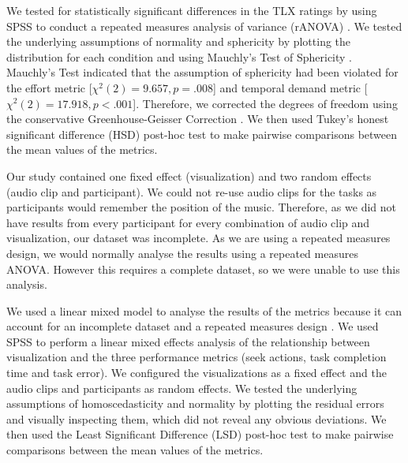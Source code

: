 We tested for statistically significant differences in the TLX ratings by using SPSS to conduct a repeated measures
analysis of variance (rANOVA) \citep[p.~409]{Shalabh2009}.  We tested the underlying assumptions of normality and
sphericity by plotting the distribution for each condition and using Mauchly's Test of Sphericity
\citep[p.~415]{Shalabh2009}.  Mauchly's Test indicated that the assumption of sphericity had been violated for the
effort metric [$\chi^2(2) = 9.657, p=.008$] and temporal demand metric [$\chi^2(2) = 17.918, p<.001$]. Therefore, we
corrected the degrees of freedom using the conservative Greenhouse-Geisser Correction \citep[p.~416]{Shalabh2009}.  We
then used Tukey's honest significant difference (HSD) post-hoc test \citep[p.~139]{Shalabh2009} to make pairwise
comparisons between the mean values of the metrics.

Our study contained one fixed effect (visualization) and two random effects (audio clip and participant).  We could not
re-use audio clips for the tasks as participants would remember the position of the music.  Therefore, as we did not
have results from every participant for every combination of audio clip and visualization, our dataset was incomplete.
As we are using a repeated measures design, we would normally analyse the results using a repeated measures ANOVA.
However this requires a complete dataset, so we were unable to use this analysis.

We used a linear mixed model to analyse the results of the metrics because it can account for an incomplete dataset and
a repeated measures design \citep{Gueorguieva2004}.  We used SPSS to perform a linear mixed effects analysis
\citep[p.~274]{Shalabh2009} of the relationship between visualization and the three performance metrics (seek actions,
task completion time and task error).  We configured the visualizations as a fixed effect and the audio clips and
participants as random effects. We tested the underlying assumptions of homoscedasticity and normality by plotting the
residual errors and visually inspecting them, which did not reveal any obvious deviations.
We then used the Least Significant Difference (LSD) post-hoc test \citep[p.~137]{Shalabh2009} to make pairwise
comparisons between the mean values of the metrics.


